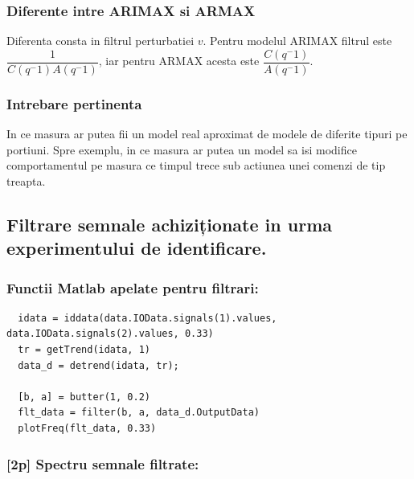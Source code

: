 \documentclass[12pt,english]{article}
\begin{document}
\subsubsection {Diferente intre ARIMAX si ARMAX}
Diferenta consta in filtrul perturbatiei $v$. Pentru modelul ARIMAX filtrul este $\dfrac{1}{C(q^-1)A(q^-1)}$, iar pentru ARMAX acesta este $\dfrac{C(q^-1)}{A(q^-1)}$.

\subsubsection {Intrebare pertinenta}
In ce masura ar putea fii un model real aproximat de modele de diferite tipuri pe portiuni. Spre exemplu, in ce masura ar putea un model sa isi modifice comportamentul pe masura ce timpul trece sub actiunea unei comenzi de tip treapta.

\subsection {Filtrare semnale achiziționate in urma experimentului de identificare. }
\subsubsection {Functii Matlab apelate pentru filtrari: }
\begin{lstlisting}
  idata = iddata(data.IOData.signals(1).values, data.IOData.signals(2).values, 0.33)
  tr = getTrend(idata, 1)
  data_d = detrend(idata, tr);

  [b, a] = butter(1, 0.2)
  flt_data = filter(b, a, data_d.OutputData)
  plotFreq(flt_data, 0.33)
\end{lstlisting}
\subsubsection {[2p] Spectru semnale filtrate: }
\begin{center}
\end{center}
\end{document}
